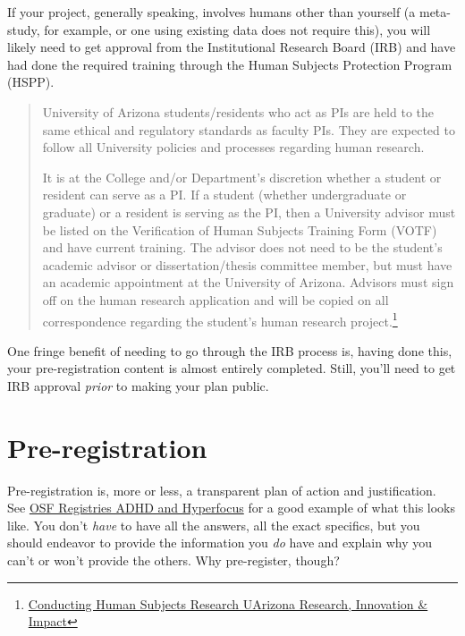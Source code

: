 \documentclass[]{tufte-book}
\begin{document}
If your project, generally speaking, involves humans other than yourself (a meta-study, for example, or one using existing data does not require this), you will likely need to get approval from the Institutional Research Board (IRB) and have had done the required training through the Human Subjects Protection Program (HSPP).

\begin{quote}
University of Arizona students/residents who act as PIs are held to the same ethical and regulatory standards as faculty PIs. They are expected to follow all University policies and processes regarding human research.

It is at the College and/or Department's discretion whether a student or resident can serve as a PI. If a student (whether undergraduate or graduate) or a resident is serving as the PI, then a University advisor must be listed on the Verification of Human Subjects Training Form (VOTF) and have current training. The advisor does not need to be the student's academic advisor or dissertation/thesis committee member, but must have an academic appointment at the University of Arizona. Advisors must sign off on the human research application and will be copied on all correspondence regarding the student's human research project.\footnote{\href{https://research.arizona.edu/administration/getting-started/Principal-Investigator-Eligibility/conducting-human-subjects-research}{Conducting Human Subjects Research \textbar{} UArizona Research, Innovation \& Impact}}
\end{quote}

One fringe benefit of needing to go through the IRB process is, having done this, your pre-registration content is almost entirely completed. Still, you'll need to get IRB approval \emph{prior} to making your plan public.

\hypertarget{pre-registration}{%
\section{Pre-registration}\label{pre-registration}}

Pre-registration is, more or less, a transparent plan of action and justification. See \href{https://osf.io/ta92r}{OSF Registries \textbar{} ADHD and Hyperfocus} for a good example of what this looks like. You don't \emph{have} to have all the answers, all the exact specifics, but you should endeavor to provide the information you \emph{do} have and explain why you can't or won't provide the others. Why pre-register, though?
\end{document}
